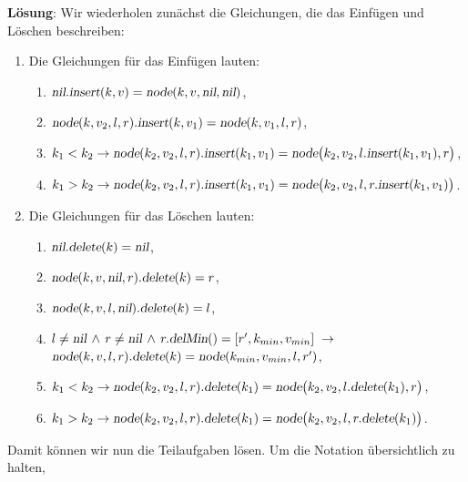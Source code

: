 \documentclass{article}
\renewcommand{\labelenumi}{(\alph{enumi})}
\newcounter{aufgabe}
\begin{document}
\noindent
\textbf{L\"osung}:
Wir wiederholen zun\"achst die Gleichungen, die das Einf\"ugen und L\"oschen beschreiben:
\begin{enumerate}
\renewcommand{\labelenumi}{\arabic{enumi}.}
\item Die Gleichungen f\"ur das Einf\"ugen lauten:
  \begin{enumerate}
  \item $\textsl{nil}\mathtt{.}\textsl{insert}(k,v) = \textsl{node}(k,v, \textsl{nil}, \textsl{nil})$,
  \item $\textsl{node}(k, v_2, l, r)\mathtt{.}\textsl{insert}(k,v_1) = \textsl{node}(k, v_1, l, r)$,
  \item $k_1 < k_2 \rightarrow 
          \textsl{node}(k_2, v_2, l, r)\mathtt{.}\textsl{insert}(k_1, v_1) =
          \textsl{node}\bigl(k_2, v_2, l\mathtt{.}\textsl{insert}(k_1, v_1), r\bigr)$,
  \item $k_1 > k_2 \rightarrow 
         \textsl{node}(k_2, v_2, l, r)\mathtt{.}\textsl{insert}(k_1, v_1) = 
         \textsl{node}\bigl(k_2, v_2, l, r\mathtt{.}\textsl{insert}(k_1, v_1)\bigr)$.
\end{enumerate}
\item Die Gleichungen f\"ur das L\"oschen lauten:
  \begin{enumerate}
  \item $\textsl{nil}\mathtt{.}\textsl{delete}(k) = \textsl{nil}$,
  \item $\textsl{node}(k,v,\textsl{nil},r)\mathtt{.}\textsl{delete}(k) = r$,
  \item $\textsl{node}(k,v,l,\textsl{nil})\mathtt{.}\textsl{delete}(k) = l$,
  \item $l \not= \textsl{nil} \,\wedge\, r \not= \textsl{nil} \,\wedge\, r\mathtt{.}\textsl{delMin}() = [r',k_{min}, v_{min}]  \;\rightarrow$ \\[0.1cm]
      \hspace*{1.3cm}
      $\textsl{node}(k,v,l,r)\mathtt{.}\textsl{delete}(k) = \textsl{node}(k_{min},v_{min},l,r')$,
  \item $k_1 < k_2 \rightarrow \textsl{node}(k_2,v_2,l,r)\mathtt{.}\textsl{delete}(k_1) = 
       \textsl{node}\bigl(k_2,v_2,l\mathtt{.}\textsl{delete}(k_1),r\bigr)$,
  \item $k_1 > k_2 \rightarrow \textsl{node}(k_2,v_2,l,r)\mathtt{.}\textsl{delete}(k_1) = 
       \textsl{node}\bigl(k_2,v_2,l,r\mathtt{.}\textsl{delete}(k_1)\bigr)$.
\end{enumerate}
\end{enumerate}
Damit k\"onnen wir nun die Teilaufgaben l\"osen.  Um die Notation \"ubersichtlich zu halten,
\end{document}
